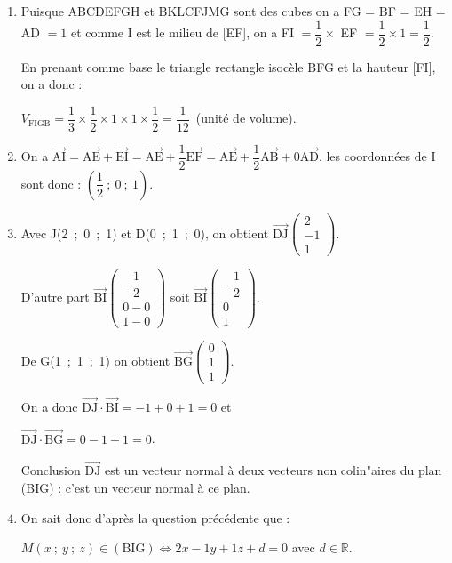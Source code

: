 \documentclass[10pt]{article}
\providecommand{\R}{\mathbb{R}}
\providecommand{\vect}[1]{\overrightarrow{#1}}
\begin{document}
\begin{enumerate}
\item 




Puisque ABCDEFGH et BKLCFJMG sont des cubes on a FG = BF = EH = AD $ = 1$ et comme I est le milieu de [EF], on a FI $= \dfrac12 \times $ EF $ = \dfrac12 \times 1 = \dfrac12$.

En prenant comme base le triangle rectangle isocèle BFG et la hauteur [FI], on a donc :

$V_{\text{FIGB}} = \dfrac13 \times \dfrac12 \times 1 \times 1 \times \dfrac12 = \dfrac{1}{12}$~(unité de volume).
\item 
On a $\vect{\text{AI}} = \vect{\text{AE}} + \vect{\text{EI}} = \vect{\text{AE}} + \dfrac12\vect{\text{EF}} = \vect{\text{AE}} + \dfrac12\vect{\text{AB}} + 0\vect{\text{AD}}$. les coordonnées de I sont donc : $\left(\dfrac12~;~0~;~1\right)$.
\item 
Avec J(2~;~0~;~1) et D(0~;~1~;~0), on obtient $\vect{\text{DJ}}\begin{pmatrix}2\\-1\\1\end{pmatrix}$.

D'autre part $\vect{\text{BI}}\begin{pmatrix}- \dfrac12\\0 - 0\\1 - 0 \end{pmatrix}$ soit $\vect{\text{BI}}\begin{pmatrix}- \dfrac12\\0 \\1\end{pmatrix}$.

De G(1~;~1~;~1) on obtient $\vect{\text{BG}}\begin{pmatrix}0\\1\\1\end{pmatrix}$.

On a donc $\vect{\text{DJ}}\cdot \vect{\text{BI}} = -1 + 0 + 1 = 0$ et 

$\vect{\text{DJ}}\cdot \vect{\text{BG}} = 0 - 1 + 1 = 0$.

Conclusion $\vect{\text{DJ}}$ est un vecteur normal à deux vecteurs non colin"aires du plan (BIG) : c'est un vecteur normal à ce plan.
\item 
On sait donc d'après la question précédente que :

$M(x~;~y~;~z) \in (\text{BIG}) \iff 2x - 1y + 1z + d = 0$ avec $d \in \R$.


\end{enumerate}
\end{document}
